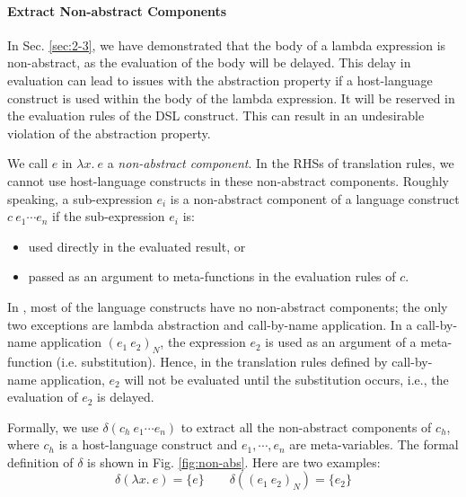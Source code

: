 \paragraph{Extract Non-abstract Components}

In Sec. \ref{sec:2-3}, we have demonstrated that the body of a lambda expression is non-abstract,
 as the evaluation of the body will be delayed.
This delay in evaluation can lead to issues with the abstraction property if a host-language construct is used within the body of the lambda expression.
It will be reserved in the evaluation rules of the DSL construct. 
This can result in an undesirable violation of the abstraction property.

We call $e$ in $\lambda x.~e$ a \textit{non-abstract component}. 
In the RHSs of translation rules, we cannot use host-language constructs in these non-abstract components. 
Roughly speaking, a sub-expression $e_i$ is a non-abstract component of a language construct $c~e_1\cdots e_n$ if the sub-expression $e_i$ is:
\begin{itemize}
    \item used directly in the evaluated result, or
    \item passed as an argument to meta-functions in the evaluation rules of $c$.
\end{itemize}

In \Func, most of the language constructs have no non-abstract components;
the only two exceptions are lambda abstraction and call-by-name application.
In a call-by-name application $(e_1~e_2)_N$, 
the expression $e_2$ is used as an argument of a meta-function (i.e. substitution).
Hence, in the translation rules defined by call-by-name application, 
$e_2$ will not be evaluated until the substitution occurs, i.e., the evaluation of $e_2$ is delayed.

Formally, we use $\delta(c_h~e_1\cdots e_n)$ to extract all the non-abstract components of $c_h$, 
where $c_h$ is a host-language construct and $e_1,\cdots, e_n$ are meta-variables.
The formal definition of $\delta$ is shown in Fig. \ref{fig:non-abs}.
Here are two examples:
\[ \delta(\lambda x.~e)=\{e\} \qquad \delta((e_1~e_2)_N)=\{e_2\} \]

